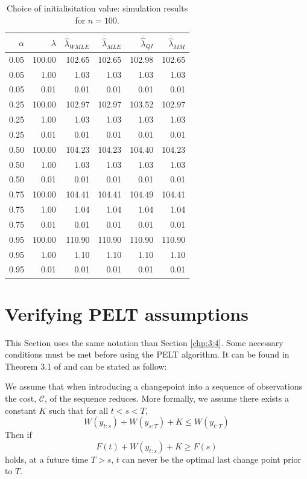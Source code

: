 \begin{appendices}
\begin{table}[ht]
\centering
\begin{tabular}{|rr||rrrr|}
\hline
 $\alpha$ & $\lambda$ & $\overline{\hat\lambda}_{WMLE}$ & $\overline{\hat\lambda}_{MLE}$ & $\overline{\hat\lambda}_{QI}$ & $\overline{\hat\lambda}_{MM}$ \\ 
  \hline
  \hline
0.05 & 100.00 & 102.65 & 102.65 & 102.98 & 102.65 \\ 
  0.05 & 1.00 & 1.03 & 1.03 & 1.03 & 1.03 \\ 
  0.05 & 0.01 & 0.01 & 0.01 & 0.01 & 0.01 \\ 
  0.25 & 100.00 & 102.97 & 102.97 & 103.52 & 102.97 \\ 
  0.25 & 1.00 & 1.03 & 1.03 & 1.03 & 1.03 \\ 
  0.25 & 0.01 & 0.01 & 0.01 & 0.01 & 0.01 \\ 
  0.50 & 100.00 & 104.23 & 104.23 & 104.40 & 104.23 \\ 
  0.50 & 1.00 & 1.03 & 1.03 & 1.03 & 1.03 \\ 
  0.50 & 0.01 & 0.01 & 0.01 & 0.01 & 0.01 \\ 
  0.75 & 100.00 & 104.41 & 104.41 & 104.49 & 104.41 \\ 
  0.75 & 1.00 & 1.04 & 1.04 & 1.04 & 1.04 \\ 
  0.75 & 0.01 & 0.01 & 0.01 & 0.01 & 0.01 \\ 
  0.95 & 100.00 & 110.90 & 110.90 & 110.90 & 110.90 \\ 
  0.95 & 1.00 & 1.10 & 1.10 & 1.10 & 1.10 \\ 
  0.95 & 0.01 & 0.01 & 0.01 & 0.01 & 0.01 \\ 
   \hline
\end{tabular}
\caption{Choice of initialisitation value: simulation results for $n = 100$.}\label{tab:sim:init2}
\end{table}

\section{Verifying PELT assumptions}\label{app:chap4:3}

This Section uses the same notation than Section \ref{chp:3:4}. Some necessary conditions must be met before using the PELT algorithm. It can be found in Theorem 3.1 of \cite{Killick2012} and can be stated as follow:  
\begin{proposition}
    We assume that  when  introducing a changepoint into a sequence of observations the  cost, $\mathcal{C}$, of the sequence reduces. More formally, we assume there exists a constant $K$ such that for all $t<s<T$,
    \begin{equation}\label{app:pelt}
      W(y_{t:s}) + W(y_{s:T}) + K \leq W(y_{t:T})  
    \end{equation}
    Then if
    \begin{equation}\label{app:pelt2}
      F(t)+W(y_{t:s})+K \geq F(s)  
    \end{equation}
    holds, at a future time $T>s$, $t$ can never be the optimal last change point prior to $T$.
\end{proposition}


\end{appendices}
